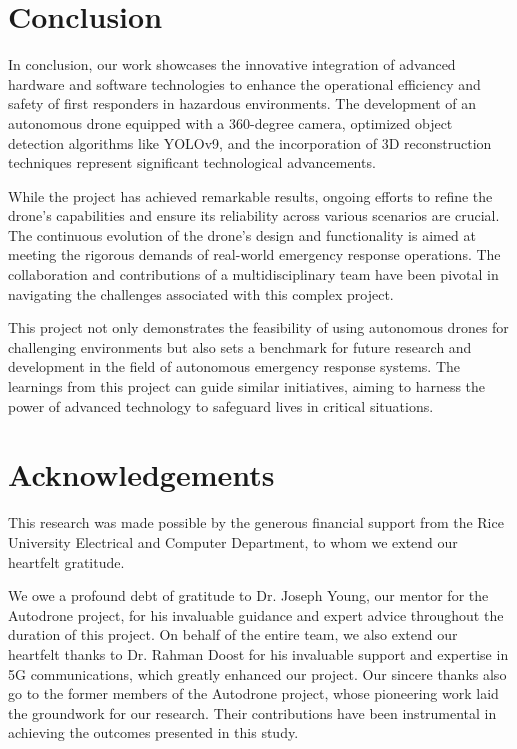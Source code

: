 \documentclass[conference]{IEEEtran}
\begin{document}
\section{Conclusion}
In conclusion, our work showcases the innovative integration of advanced hardware and software technologies to enhance the operational efficiency and safety of first responders in hazardous environments. The development of an autonomous drone equipped with a 360-degree camera, optimized object detection algorithms like YOLOv9, and the incorporation of 3D reconstruction techniques represent significant technological advancements.


While the project has achieved remarkable results, ongoing efforts to refine the drone's capabilities and ensure its reliability across various scenarios are crucial. The continuous evolution of the drone's design and functionality is aimed at meeting the rigorous demands of real-world emergency response operations. The collaboration and contributions of a multidisciplinary team have been pivotal in navigating the challenges associated with this complex project.

This project not only demonstrates the feasibility of using autonomous drones for challenging environments but also sets a benchmark for future research and development in the field of autonomous emergency response systems. The learnings from this project can guide similar initiatives, aiming to harness the power of advanced technology to safeguard lives in critical situations.


\section*{Acknowledgements}
This research was made possible by the generous financial support from the Rice University Electrical and Computer Department, to whom we extend our heartfelt gratitude.

We owe a profound debt of gratitude to Dr. Joseph Young, our mentor for the Autodrone project, for his invaluable guidance and expert advice throughout the duration of this project. On behalf of the entire team, we also extend our heartfelt thanks to Dr. Rahman Doost for his invaluable support and expertise in 5G communications, which greatly enhanced our project. Our sincere thanks also go to the former members of the Autodrone project, whose pioneering work laid the groundwork for our research. Their contributions have been instrumental in achieving the outcomes presented in this study.
\end{document}
